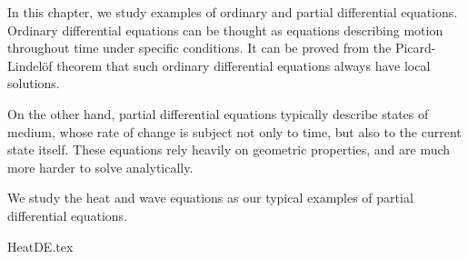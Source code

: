\label{chap:opde}

In this chapter,
we study examples of ordinary and partial differential equations.
Ordinary differential equations can be thought as
equations describing motion throughout time under specific conditions.
It can be proved from the Picard-Lindel\"of theorem that
such ordinary differential equations always have local solutions.

On the other hand,
partial differential equations typically describe states of medium,
whose rate of change is subject not only to time,
but also to the current state itself.
These equations rely heavily on geometric properties,
and are much more harder to solve analytically.

We study the heat and wave equations as
our typical examples of partial differential equations.

{HeatDE.tex}